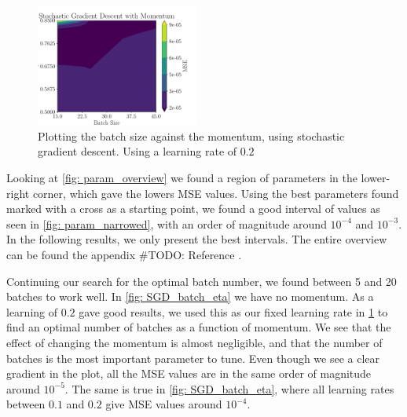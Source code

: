 \begin{figure}[ht!]
    \centering
    \includegraphics[width = 0.47575\textwidth]{../figs/SGD_batch_gamma.pdf}
    \caption{Plotting the batch size against the momentum, using stochastic gradient descent. Using a learning rate of $0.2$}
    \label{fig: SGD_batch_gamma}
\end{figure}

Looking at \cref{fig: param_overview}  we found a region of parameters  in the lower-right corner, which gave the lowers MSE values. Using the best parameters found marked with a cross as a starting point, we found a good interval of values as seen in \cref{fig: param_narrowed}, with an order of magnitude around $10^{-4}$ and $10^{-3}$. In the following results, we only present the best intervals. The entire overview can be found the appendix \color{magenta}\#TODO: Reference \color{black}.

Continuing our search for the optimal batch number, we found between 5 and 20 batches to work well. In \cref{fig: SGD_batch_eta} we have no momentum. As a learning of $0.2$ gave good results, we used this as our fixed learning rate in \cref{fig: SGD_batch_gamma} to find an optimal number of batches as a function of momentum. We see that the effect of changing the momentum is almost negligible, and that the number of batches is the most important parameter to tune. Even though we see a clear gradient in the plot, all the MSE values are in the same order of magnitude around \(10^{-5}\). The same is true in \cref{fig: SGD_batch_eta}, where all learning rates between $0.1$ and $0.2$ give MSE values around \(10^{-4}\).

